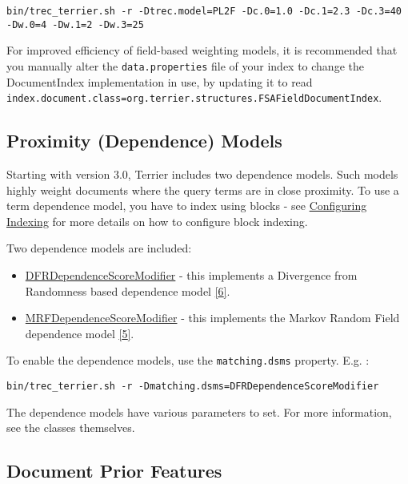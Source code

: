 \begin{verbatim}
bin/trec_terrier.sh -r -Dtrec.model=PL2F -Dc.0=1.0 -Dc.1=2.3 -Dc.3=40 -Dw.0=4 -Dw.1=2 -Dw.3=25
\end{verbatim}

For improved efficiency of field-based weighting models, it is
recommended that you manually alter the \texttt{data.properties} file of
your index to change the DocumentIndex implementation in use, by
updating it to read
\texttt{index.document.class=org.terrier.structures.FSAFieldDocumentIndex}.
\href{}{}

\subsection{Proximity (Dependence)
Models}\label{proximity-dependence-models}

Starting with version 3.0, Terrier includes two dependence models. Such
models highly weight documents where the query terms are in close
proximity. To use a term dependence model, you have to index using
blocks - see \href{configure_indexing.html}{Configuring Indexing} for
more details on how to configure block indexing.

Two dependence models are included:

\begin{itemize}
\tightlist
\item
  \href{javadoc/org/terrier/matching/dsms/DFRDependenceScoreModifier.html}{DFRDependenceScoreModifier}
  - this implements a Divergence from Randomness based dependence model
  \protect\hyperlink{cite6}{{[}6{]}}.
\item
  \href{javadoc/org/terrier/matching/dsms/MRFDependenceScoreModifier.html}{MRFDependenceScoreModifier}
  - this implements the Markov Random Field dependence model
  \protect\hyperlink{cite5}{{[}5{]}}.
\end{itemize}

To enable the dependence models, use the \texttt{matching.dsms}
property. E.g. :

\begin{verbatim}
bin/trec_terrier.sh -r -Dmatching.dsms=DFRDependenceScoreModifier
\end{verbatim}

The dependence models have various parameters to set. For more
information, see the classes themselves.

\href{}{}

\subsection{Document Prior Features}\label{document-prior-features}

